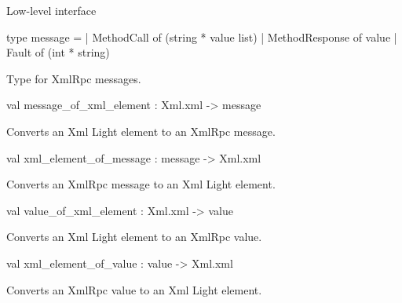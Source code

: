 \documentclass[11pt]{article}
\begin{document}
Low-level interface



\label{type:XmlRpc.message}\begin{ocamldoccode}
type message =
  | MethodCall of (string * value list)
  | MethodResponse of value
  | Fault of (int * string)
\end{ocamldoccode}
\begin{ocamldocdescription}
Type for XmlRpc messages.


\end{ocamldocdescription}




\label{val:XmlRpc.message-underscoreof-underscorexml-underscoreelement}\begin{ocamldoccode}
val message_of_xml_element : Xml.xml -> message
\end{ocamldoccode}
\begin{ocamldocdescription}
Converts an Xml Light element to an XmlRpc message.


\end{ocamldocdescription}




\label{val:XmlRpc.xml-underscoreelement-underscoreof-underscoremessage}\begin{ocamldoccode}
val xml_element_of_message : message -> Xml.xml
\end{ocamldoccode}
\begin{ocamldocdescription}
Converts an XmlRpc message to an Xml Light element.


\end{ocamldocdescription}




\label{val:XmlRpc.value-underscoreof-underscorexml-underscoreelement}\begin{ocamldoccode}
val value_of_xml_element : Xml.xml -> value
\end{ocamldoccode}
\begin{ocamldocdescription}
Converts an Xml Light element to an XmlRpc value.


\end{ocamldocdescription}




\label{val:XmlRpc.xml-underscoreelement-underscoreof-underscorevalue}\begin{ocamldoccode}
val xml_element_of_value : value -> Xml.xml
\end{ocamldoccode}
\begin{ocamldocdescription}
Converts an XmlRpc value to an Xml Light element.


\end{ocamldocdescription}
\end{document}

